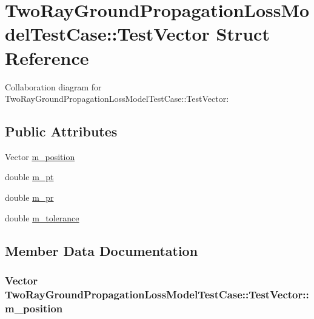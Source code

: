 \hypertarget{structTwoRayGroundPropagationLossModelTestCase_1_1TestVector}{}\section{Two\+Ray\+Ground\+Propagation\+Loss\+Model\+Test\+Case\+:\+:Test\+Vector Struct Reference}
\label{structTwoRayGroundPropagationLossModelTestCase_1_1TestVector}


Collaboration diagram for Two\+Ray\+Ground\+Propagation\+Loss\+Model\+Test\+Case\+:\+:Test\+Vector\+:
\subsection*{Public Attributes}
\begin{DoxyCompactItemize}
\item 
Vector \hyperlink{structTwoRayGroundPropagationLossModelTestCase_1_1TestVector_ab962b9ca65fa9a834290128bb58b6fb8}{m\+\_\+position}
\item 
double \hyperlink{structTwoRayGroundPropagationLossModelTestCase_1_1TestVector_a0457de22049c6a36e059d8d22f18d14a}{m\+\_\+pt}
\item 
double \hyperlink{structTwoRayGroundPropagationLossModelTestCase_1_1TestVector_a8f7fe080696e10432ff444556c7b9468}{m\+\_\+pr}
\item 
double \hyperlink{structTwoRayGroundPropagationLossModelTestCase_1_1TestVector_a50affc056d660edf564c022b9cf4336c}{m\+\_\+tolerance}
\end{DoxyCompactItemize}


\subsection{Member Data Documentation}
\subsubsection[{\texorpdfstring{m\+\_\+position}{m_position}}]{\setlength{\rightskip}{0pt plus 5cm}Vector Two\+Ray\+Ground\+Propagation\+Loss\+Model\+Test\+Case\+::\+Test\+Vector\+::m\+\_\+position}\hypertarget{structTwoRayGroundPropagationLossModelTestCase_1_1TestVector_ab962b9ca65fa9a834290128bb58b6fb8}{}\label{structTwoRayGroundPropagationLossModelTestCase_1_1TestVector_ab962b9ca65fa9a834290128bb58b6fb8}
